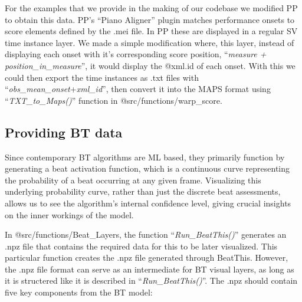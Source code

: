 \noindent For the examples that we provide in the making of our codebase we modified PP to obtain this data. PP's ``Piano Aligner'' plugin \cite{jiangPIANOPRECISIONADVANCING2025} matches performance onsets to score elements defined by the .mei file. In PP these are displayed in a regular SV time instance layer. We made a simple modification where, this layer, instead of displaying each onset with it's corresponding score position, ``\textit{measure + position\_in\_measure}'', it would display the @xml.id of each onset. With this we could then export the time instances as .txt files with ``\textit{obs\_mean\_onset}+\textit{xml\_id}'', then convert it into the MAPS format using ``\textit{TXT\_to\_Maps()}'' function in @src/functions/warp\_score.

\subsection{Providing BT data}
Since contemporary BT algorithms are ML based, they primarily function by generating a beat activation function, which is a continuous curve representing the probability of a beat occurring at any given frame. Visualizing this underlying probability curve, rather than just the discrete beat assessments, allows us to see the algorithm's internal confidence level, giving crucial insights on the inner workings of the model.

\noindent In @src/functions/Beat\_Layers, the function ``\textit{Run\_BeatThis()}'' generates an .npz file that contains the required data for this to be later visualized. This particular function creates the .npz file generated through BeatThis. However, the .npz file format can serve as an intermediate for BT visual layers, as long as it is structered like it is described in ``\textit{Run\_BeatThis()}''. The .npz should contain five key components from the BT model:

